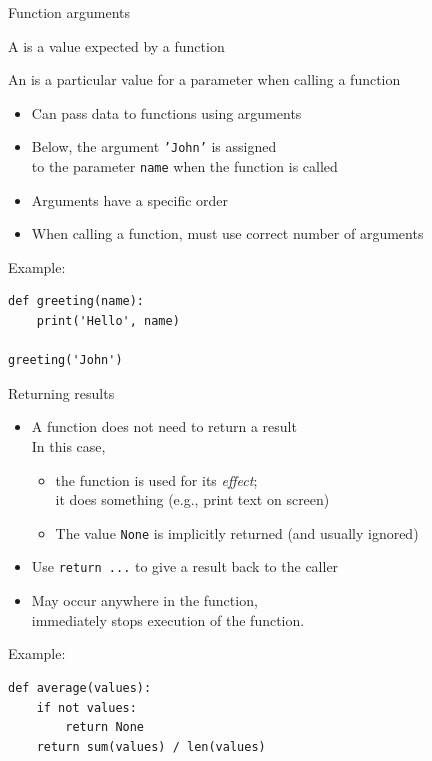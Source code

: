\documentclass[aspectratio=169,usenames,dvipsnames]{beamer}
\begin{document}
\begin{frame}[fragile]{Function arguments}
    \begin{definition}
        A  is a value expected by a function

        An  is a particular value for a parameter
            when calling a function
    \end{definition}

    \begin{itemize}
        \item Can pass data to functions using arguments
        \item Below, the argument \texttt{'John'} is assigned \\
            to the parameter \texttt{name} when the function is called
        \item Arguments have a specific order
        \item When calling a function, must use correct number of arguments
    \end{itemize}
Example:
\begin{lstlisting}
def greeting(name):
    print('Hello', name)

greeting('John')
\end{lstlisting}
\end{frame}

\begin{frame}[fragile]{Returning results}
    \begin{itemize}
        \item A function does not need to return a result \\
            In this case,
            \begin{itemize}
                \item the function is used for its \emph{effect};\\
                    it does something (e.g., print text on screen)
                \item The value \texttt{None} is implicitly returned
                        (and usually ignored)
            \end{itemize}
        \item Use \texttt{return ...} to give a result back to the caller
        \item May occur anywhere in the function,\\
                immediately stops execution of the function.
    \end{itemize}

Example:
\begin{lstlisting}
def average(values):
    if not values:
        return None
    return sum(values) / len(values)
\end{lstlisting}
\end{frame}
\end{document}
